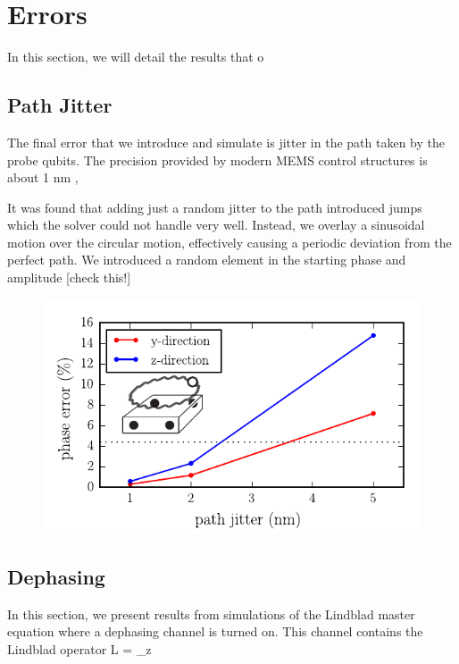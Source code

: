 

\section{Errors}
In this section, we will detail the results that o



\subsection{Path Jitter}\label{sec:jitter}
The final error that we introduce and simulate is jitter in the path taken by the probe qubits. The precision provided by modern MEMS control structures is about 1 nm \cite{MEMS precision}, 

It was found that adding just a random jitter to the path introduced jumps which the solver could not handle very well. Instead, we overlay a sinusoidal motion over the circular motion, effectively causing a periodic deviation from the perfect path. We introduced a random element in the starting phase and amplitude [check this!] 


\begin{figure}[H]
	\includegraphics[width=\linewidth]{../Figures/path_jit}
	\caption{}
	\label{FIG:pjit}
\end{figure}


\subsection{Dephasing}
In this section, we present results from simulations of the Lindblad master equation where a dephasing channel is turned on. This channel contains the Lindblad operator
\beq
L  = \sqrt{\Gamma} \sigma_z
\eeq

